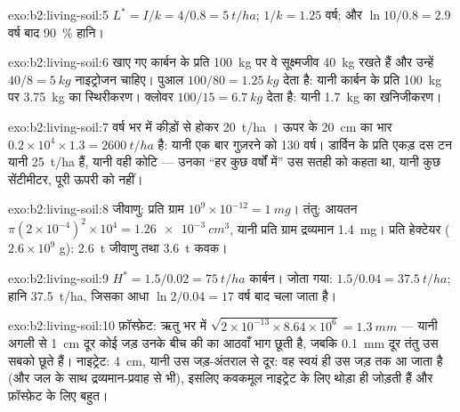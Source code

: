 \begin{solution}{exo:b2:living-soil:5}
$L^{*} = I/k = 4/0.8 = \qty{5}{t/ha}$;  $1/k = 1.25$
वर्ष; और $\ln 10/0.8 = 2.9$ वर्ष बाद \qty{90}{\%} हानि।
\end{solution}

\begin{solution}{exo:b2:living-soil:6}
खाए गए कार्बन के प्रति \qty{100}{kg} पर वे सूक्ष्मजीव \qty{40}{kg} रखते हैं और
उन्हें $40/8 = \qty{5}{kg}$ नाइट्रोजन चाहिए। पुआल $100/80 =
\qty{1.25}{kg}$ देता है: यानी कार्बन के प्रति \qty{100}{kg} पर \qty{3.75}{kg} का
स्थिरीकरण। क्लोवर $100/15 = \qty{6.7}{kg}$ देता है: यानी \qty{1.7}{kg} का
खनिजीकरण।
\end{solution}

\begin{solution}{exo:b2:living-soil:7}
वर्ष भर में कीड़ों से होकर \qty{20}{t/ha} । ऊपर के
\qty{20}{cm} का भार $0.2\times 10^{4}\times 1.3 = \qty{2600}{t/ha}$ है:
यानी एक बार गुज़रने को 130 वर्ष। डार्विन के प्रति एकड़ दस टन यानी
\qty{25}{t/ha} हैं, यानी वही कोटि --- उनका ``हर कुछ वर्षों में'' उस
सतही  को कहता था, यानी कुछ सेंटीमीटर, पूरी ऊपरी  को नहीं।
\end{solution}

\begin{solution}{exo:b2:living-soil:8}
जीवाणु: प्रति ग्राम $10^{9}\times 10^{-12} = \qty{1}{mg}$। तंतु:
आयतन $\pi(2\times 10^{-4})^{2}\times 10^{4} = \qty{1.26e-3}{cm^3}$,
यानी प्रति ग्राम द्रव्यमान \qty{1.4}{mg}। प्रति हेक्टेयर ($2.6\times 10^{9}$ g):
\qty{2.6}{t} जीवाणु तथा \qty{3.6}{t} कवक।
\end{solution}

\begin{solution}{exo:b2:living-soil:9}
$H^{*} = 1.5/0.02 = \qty{75}{t/ha}$ कार्बन। जोता गया: $1.5/0.04
= \qty{37.5}{t/ha}$; हानि \qty{37.5}{t/ha}, जिसका आधा
$\ln 2/0.04 = 17$ वर्ष बाद चला जाता है।
\end{solution}

\begin{solution}{exo:b2:living-soil:10}
फ़ॉस्फ़ेट: ऋतु भर में $\sqrt{2\times 10^{-13}\times 8.64\times 10^{6}} =
\qty{1.3}{mm}$ --- यानी अगली से \qty{1}{cm} दूर कोई जड़
उनके बीच की  का आठवाँ भाग छूती है, जबकि \qty{0.1}{mm}
दूर तंतु उस सबको छूते हैं। नाइट्रेट: \qty{4}{cm}, यानी उस जड़-अंतराल से
दूर: वह स्वयं ही उस जड़ तक आ जाता है (और जल के साथ
द्रव्यमान-प्रवाह से भी), इसलिए कवकमूल नाइट्रेट के लिए थोड़ा ही जोड़ती हैं और
फ़ॉस्फ़ेट के लिए बहुत।
\end{solution}

